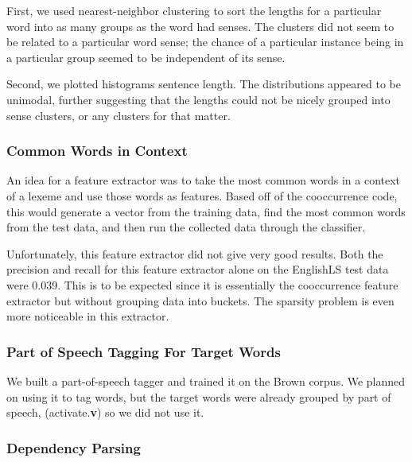 \documentclass{article}
\begin{document}
First, we used nearest-neighbor clustering to sort the lengths for a particular
word into as many groups as the word had senses. The clusters did not seem to be
related to a particular word sense; the chance of a particular instance being in
a particular group seemed to be independent of its sense.

Second, we plotted histograms sentence length. The distributions appeared to be
unimodal, further suggesting that the lengths could not be nicely grouped into
sense clusters, or any clusters for that matter.

\subsubsection{Common Words in Context}

An idea for a feature extractor was to take the most common words in a context
of a lexeme and use those words as features. Based off of the cooccurrence code,
this would generate a vector from the training data, find the most common words
from the test data, and then run the collected data through the classifier.

Unfortunately, this feature extractor did not give very good results. Both the
precision and recall for this feature extractor alone on the EnglishLS test data
were 0.039. This is to be expected since it is essentially the cooccurrence
feature extractor but without grouping data into buckets. The sparsity problem
is even more noticeable in this extractor.

\subsubsection{Part of Speech Tagging For Target Words}

We built a part-of-speech tagger and trained it on the Brown corpus. We planned
on using it to tag words, but the target words were already grouped by part of
speech, (activate.\textbf{v}) so we did not use it.


\subsubsection{Dependency Parsing}
\end{document}

